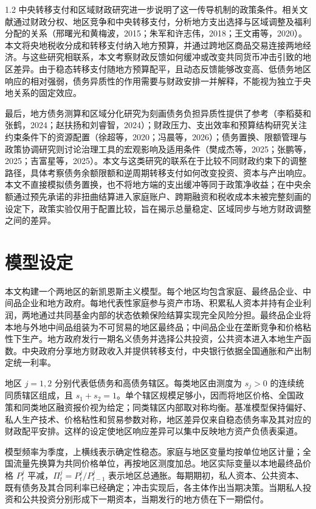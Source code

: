 \documentclass[12pt,UTF8]{ctexart}
\begin{document}
\begin{spacing}{1.2}
		中央转移支付和区域财政研究进一步说明了这一传导机制的政策条件。相关文献通过财政分权、地区竞争和中央转移支付，分析地方支出选择与区域调整及福利分配的关系（邢曙光和黄梅波，2015；朱军和许志伟，2018；王文甫等，2020）。本文将央地税收分成和转移支付纳入地方预算，并通过跨地区商品交易连接两地经济。与这些研究相联系，本文考察财政反馈如何缓冲或改变共同货币冲击引致的地区差异。由于稳态转移支付随地方预算配平，且动态反馈能够改变高、低债务地区响应的相对强弱，债务异质性的作用需要与财政安排一并解释，不能视为独立于央地关系的固定效应。
		
		最后，地方债务测算和区域分化研究为刻画债务负担异质性提供了参考（李稻葵和张鹤，2024；赵扶扬和刘睿智，2024）；财政压力、支出效率和预算结构研究关注约束条件下的资源配置（徐超等，2020；冯晨等，2026）；债务置换、限额管理与政策协调研究则讨论治理工具的宏观影响及适用条件（樊成杰等，2025；张鹏等，2025；吉富星等，2025）。本文与这类研究的联系在于比较不同财政约束下的调整路径，具体考察债务余额限额和逆周期转移支付如何改变投资、资本与产出响应。本文不直接模拟债务置换，也不将地方端的支出缓冲等同于政策净收益；在中央余额通过预先承诺的非扭曲结算进入家庭账户、跨期融资和税收成本未被完整刻画的设定下，政策实验仅用于配置比较，旨在揭示总量稳定、区域同步与地方财政调整之间的差异。
		
		\section{模型设定}
		
		本文构建一个两地区的新凯恩斯主义模型。每个地区均包含家庭、最终品企业、中间品企业和地方政府。每地代表性家庭参与资产市场、积累私人资本并持有企业利润，两地通过共同基金内部的状态依赖保险结算实现完全风险分担。最终品企业将本地与外地中间品组装为不可贸易的地区最终品；中间品企业在垄断竞争和价格粘性下生产。地方政府发行一期名义债务并选择公共投资，公共资本进入本地生产函数。中央政府分享地方财政收入并提供转移支付，中央银行依据全国通胀和产出制定统一利率。
		
		地区 $j=1,2$ 分别代表低债务和高债务辖区。每类地区由测度为 $s_j>0$ 的连续统同质辖区组成，且 $s_1+s_2=1$。单个辖区规模足够小，因而将地区价格、全国政策和同类地区融资报价视为给定；同类辖区内部取对称均衡。基准模型保持偏好、私人生产技术、价格粘性和贸易参数对称，地区差异仅来自稳态债务率及其对应的财政配平安排。这样的设定使地区响应差异可以集中反映地方资产负债表渠道。
		
		模型频率为季度，上横线表示确定性稳态。家庭与地区变量均按单位地区计量；全国流量先换算为共同价格单位，再按地区测度加总。地区实际变量以本地最终品价格 $P_t^j$ 平减，$\Pi_t^j=P_t^j/P_{t-1}^j$ 表示地区总通胀。每期期初，私人资本、公共资本、既有债务及其合同利率已经确定；冲击实现后，各主体作出当期决策。当期私人投资和公共投资分别形成下一期资本，当期发行的地方债在下一期偿付。
		

\end{spacing}
\end{document}
